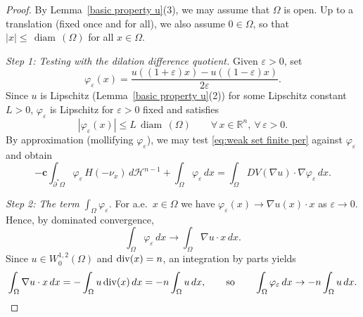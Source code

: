 \documentclass[reqno,11pt]{amsart}
\def\diam{{\mathop\mathrm{\,diam\,}}}
\numberwithin{equation}{section}
\theoremstyle{remark}
\begin{document}
\begin{proof}
By Lemma~\ref{basic property u}(3), we may assume that $\Omega$ is open.
Up to a translation (fixed once and for all), we also assume $0\in\Omega$, so that $|x|\le \diam(\Omega)$ for all $x\in\Omega$.

\medskip
\noindent\textit{Step 1: Testing with the dilation difference quotient.}
Given $\varepsilon>0$, set
\begin{equation}\label{eq:varphi eps}
\varphi_\varepsilon(x)= \frac{u((1+\varepsilon) x)-u((1-\varepsilon)x)}{2\varepsilon}.
\end{equation}
Since $u$ is Lipschitz (Lemma~\ref{basic property u}(2)) {for some Lipschitz constant $L>0$}, $\varphi_\varepsilon$ is Lipschitz for $\varepsilon>0$ fixed and satisfies
\[
{|\varphi_\varepsilon(x)|\le L \diam(\Omega)\qquad \forall\,x\in\mathbb R^n,\ \forall\,\varepsilon>0.}
\]
By approximation (mollifying $\varphi_\varepsilon$), we may test \eqref{eq:weak set finite per} against $\varphi_\varepsilon$ and obtain
\begin{equation}\label{eq:test vol}
-\mathbf{c} \int_{\partial^*\Omega}  \varphi_\varepsilon \, H(-\nu_x) \, d\mathscr H^{n-1}
+\int_{\Omega} \varphi_\varepsilon\, dx
=  \int_{\Omega} DV(\nabla u)\cdot \nabla\varphi_\varepsilon \, dx .
\end{equation}

\medskip
\noindent\textit{Step 2: The term $\int_\Omega \varphi_\varepsilon$.}
For a.e.\ $x\in\Omega$ we have $\varphi_\varepsilon(x)\to \nabla u(x)\cdot x$ as $\varepsilon\to 0$. Hence, by dominated convergence,
\[
\int_{\Omega} \varphi_\varepsilon\, dx \to \int_{\Omega} \nabla u\cdot x \, dx.
\]
Since $u\in W^{1,2}_0(\Omega)$ and ${\rm div}(x)=n$, an integration by parts yields
\begin{equation}\label{left 1}
\int_{\Omega} \nabla u\cdot x \, dx=-\int_\Omega u\,{\rm div}(x)\,dx=-n\int_{\Omega} u\, dx,
\qquad\text{so}\qquad
\int_{\Omega} \varphi_\varepsilon\, dx \to -n\int_{\Omega} u\, dx .
\end{equation}


\end{proof}
\end{document}
